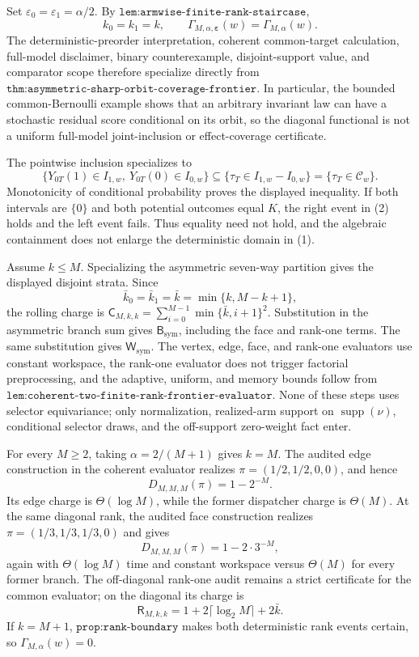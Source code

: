 Set \(\varepsilon_0=\varepsilon_1=\alpha/2\). By \(\texttt{lem:armwise-finite-rank-staircase}\),
\[
k_0=k_1=k,\qquad \Gamma_{M,\alpha,\boldsymbol\varepsilon}(w)=\Gamma_{M,\alpha}(w).
\tag{1}
\]
The deterministic-preorder interpretation, coherent common-target calculation, full-model disclaimer, binary counterexample, disjoint-support value, and comparator scope therefore specialize directly from \(\texttt{thm:asymmetric-sharp-orbit-coverage-frontier}\). In particular, the bounded common-Bernoulli example shows that an arbitrary invariant law can have a stochastic residual score conditional on its orbit, so the diagonal functional is not a uniform full-model joint-inclusion or effect-coverage certificate.

The pointwise inclusion specializes to
\[
\{Y_{0T}(1)\in I_{1,w},\ Y_{0T}(0)\in I_{0,w}\}\subseteq\{\tau_T\in I_{1,w}-I_{0,w}\}=\{\tau_T\in\mathcal C_w\}.
\tag{2}
\]
Monotonicity of conditional probability proves the displayed inequality. If both intervals are \(\{0\}\) and both potential outcomes equal \(K\), the right event in (2) holds and the left event fails. Thus equality need not hold, and the algebraic containment does not enlarge the deterministic domain in (1).

Assume \(k\le M\). Specializing the asymmetric seven-way partition gives the displayed disjoint strata. Since
\[
\bar k_0=\bar k_1=\bar k=\min\{k,M-k+1\},
\]
the rolling charge is \(\mathsf C_{M,k,k}=\sum_{i=0}^{M-1}\min\{\bar k,i+1\}^2\). Substitution in the asymmetric branch sum gives \(\mathsf B_{\mathrm{sym}}\), including the face and rank-one terms. The same substitution gives \(\mathsf W_{\mathrm{sym}}\). The vertex, edge, face, and rank-one evaluators use constant workspace, the rank-one evaluator does not trigger factorial preprocessing, and the adaptive, uniform, and memory bounds follow from \(\texttt{lem:coherent-two-finite-rank-frontier-evaluator}\). None of these steps uses selector equivariance; only normalization, realized-arm support on \(\operatorname{supp}(\nu)\), conditional selector draws, and the off-support zero-weight fact enter.

For every \(M\ge2\), taking \(\alpha=2/(M+1)\) gives \(k=M\). The audited edge construction in the coherent evaluator realizes \(\pi=(1/2,1/2,0,0)\), and hence
\[D_{M,M,M}(\pi)=1-2^{-M}.\]
Its edge charge is \(\Theta(\log M)\), while the former dispatcher charge is \(\Theta(M)\). At the same diagonal rank, the audited face construction realizes \(\pi=(1/3,1/3,1/3,0)\) and gives
\[D_{M,M,M}(\pi)=1-2\cdot3^{-M},\]
again with \(\Theta(\log M)\) time and constant workspace versus \(\Theta(M)\) for every former branch. The off-diagonal rank-one audit remains a strict certificate for the common evaluator; on the diagonal its charge is
\[\mathsf R_{M,k,k}=1+2\lceil\log_2M\rceil+2\bar k.\]
If \(k=M+1\), \(\texttt{prop:rank-boundary}\) makes both deterministic rank events certain, so \(\Gamma_{M,\alpha}(w)=0\).

